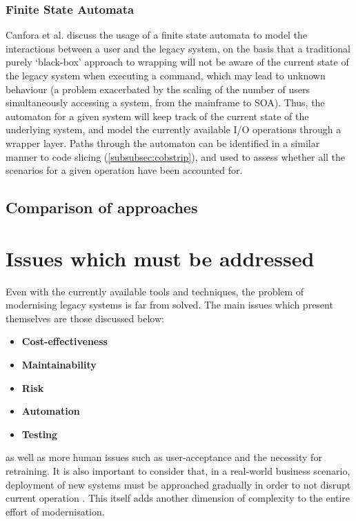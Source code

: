 \documentclass[12pt,journal,compsoc]{IEEEtran}
\begin{document}
\subsubsection{Finite State Automata}
Canfora et al. \cite{Canfora2006,Canfora2008} discuss the usage of a finite state automata to model the interactions between a user and the legacy system, on the basis that a traditional purely `black-box' approach to wrapping will not be aware of the current state of the legacy system when executing a command, which may lead to unknown behaviour (a problem exacerbated by the scaling of the number of users simultaneously accessing a system, from the mainframe to SOA). Thus, the automaton for a given system will keep track of the current state of the underlying system, and model the currently available I/O operations through a wrapper layer. Paths through the automaton can be identified in a similar manner to code slicing (\autoref{subsubsec:cobstrip}), and used to assess whether all the scenarios for a given operation have been accounted for.

\subsection{Comparison of approaches}
\label{subsec:comparison}


\section{Issues which must be addressed}
\label{sec:issues}
Even with the currently available tools and techniques, the problem of modernising legacy systems is far from solved. The main issues which present themselves are those discussed below:
\begin{itemize}
\item\textbf{Cost-effectiveness}
\item\textbf{Maintainability}
\item\textbf{Risk}
\item\textbf{Automation}
\item\textbf{Testing}
\end{itemize}
as well as more human issues such as user-acceptance and the necessity for retraining. It is also important to consider that, in a real-world business scenario, deployment of new systems must be approached gradually in order to not disrupt current operation \cite{Sneed2008,Duncan1996,Almonaies2010}. This itself adds another dimension of complexity to the entire effort of modernisation.
\end{document}
